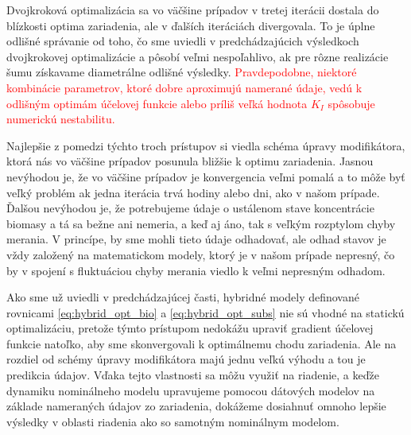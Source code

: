 Dvojkroková optimalizácia sa vo väčšine prípadov v tretej iterácii  dostala do blízkosti optima zariadenia, ale v ďalších iteráciách divergovala. To je úplne odlišné správanie od toho, čo sme uviedli v predchádzajúcich výsledkoch dvojkrokovej optimalizácie a pôsobí veľmi nespoľahlivo, ak pre rôzne realizácie šumu získavame diametrálne odlišné výsledky. \textcolor{red}{Pravdepodobne, niektoré kombinácie parametrov, ktoré dobre aproximujú namerané údaje, vedú k odlišným optimám účelovej funkcie alebo príliš veľká hodnota $ K_{I} $ spôsobuje numerickú nestabilitu.}
 
Najlepšie z pomedzi týchto troch prístupov si viedla schéma úpravy modifikátora, ktorá nás vo väčšine prípadov posunula bližšie k optimu zariadenia. Jasnou nevýhodou je, že vo väčšine prípadov je konvergencia veľmi pomalá a to môže byť veľký problém ak jedna iterácia trvá hodiny alebo dni, ako v našom prípade. Ďalšou nevýhodou je, že potrebujeme údaje o ustálenom stave koncentrácie biomasy a tá sa bežne ani nemeria, a keď aj áno, tak s veľkým rozptylom chyby merania. V princípe, by sme mohli tieto údaje odhadovať, ale odhad stavov je vždy založený na matematickom modely, ktorý je v našom prípade nepresný, čo by v spojení s fluktuáciou chyby merania viedlo k veľmi nepresným odhadom. 

Ako sme už uviedli v predchádzajúcej časti, hybridné modely definované rovnicami \eqref{eq:hybrid_opt_bio} a \eqref{eq:hybrid_opt_subs} nie sú vhodné na statickú optimalizáciu, pretože týmto prístupom nedokážu upraviť gradient účelovej funkcie natoľko, aby sme skonvergovali k optimálnemu chodu zariadenia. Ale na rozdiel od schémy úpravy modifikátora majú jednu veľkú výhodu a tou je predikcia údajov. Vďaka tejto vlastnosti sa môžu využiť na riadenie, a keďže dynamiku nominálneho modelu upravujeme pomocou dátových modelov na základe nameraných údajov zo zariadenia, dokážeme dosiahnuť omnoho lepšie výsledky v oblasti riadenia ako so samotným nominálnym modelom.

